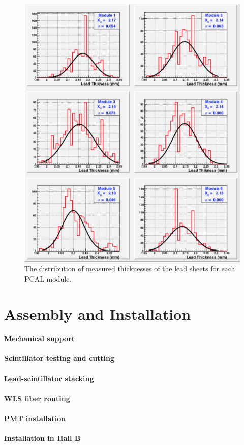 \begin{figure}[hbt]
\centering
\includegraphics[width=0.95\columnwidth,keepaspectratio]{img/S4_5.png}
\caption{The distribution of measured thicknesses of the lead sheets for each PCAL module.}
\label{fig:S4_5}
\end{figure}


\section{Assembly and Installation}
\paragraph{Mechanical support}
\paragraph{Scintillator testing and cutting}
\paragraph{Lead-scintillator stacking}
\paragraph{WLS fiber routing}
\paragraph{PMT installation}
\paragraph{Installation in Hall B}









